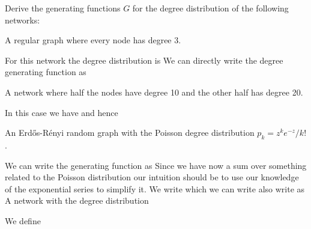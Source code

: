 \label{exGeneratingDegreeGF}
Derive the generating functions $G$ for the degree distribution of the following networks:  

\subquestion A regular graph where every node has degree 3.

\solution
For this network the degree distribution is 
We can directly write the degree generating function as 

\subquestion A network where half the nodes have degree 10 and the other half has degree 20.

\solution
In this case we have 
and hence 

\subquestion An Erd\H{o}s-R\'enyi random graph with the Poisson degree distribution $p_k=z^ke^{-z}/k!$.

\solution

We can write the generating function as 
Since we have now a sum over something related to the Poisson distribution our intuition should be to use our knowledge of the exponential series to simplify it. We write 
which we can write also write as 
\subquestion A network with the degree distribution 

\solution
We define

